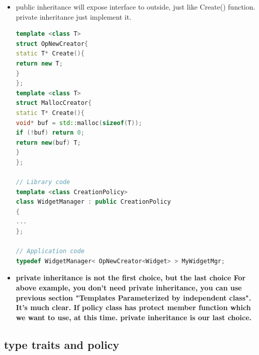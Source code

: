 \documentclass[a4paper,12pt,twoside]{book}
\begin{document}
\begin{itemize}
\item public inheritance will expose interface to outside, just like Create() function. private inheritance just implement it. 

\begin{lstlisting}[frame=single, language=c++]
template <class T>
struct OpNewCreator{
static T* Create(){
return new T;
}
};
template <class T>
struct MallocCreator{
static T* Create(){
void* buf = std::malloc(sizeof(T));
if (!buf) return 0;
return new(buf) T;
}
}; 

// Library code
template <class CreationPolicy>
class WidgetManager : public CreationPolicy
{
...
}; 

// Application code
typedef WidgetManager< OpNewCreator<Widget> > MyWidgetMgr; 
\end{lstlisting}

\item \textbf{private inheritance is not the first choice, but the last choice For above example, you don't need private inheritance, you can use previous section "Templates Parameterized by independent class". It's much clear. If policy class has protect member function which we want to use, at this time. private inheritance is our last choice. }
\end{itemize}


\subsection{type traits and policy}
\end{document}

